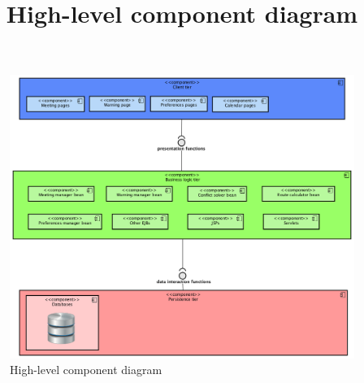 \title{High-level component diagram}

\begin{figure}
	\centering
	\includegraphics[width=1.3\textwidth]{images/HLcomponentdiagram}
	\caption{High-level component diagram}
	\label{fig:hlcomponentdiagram}
\end{figure}
